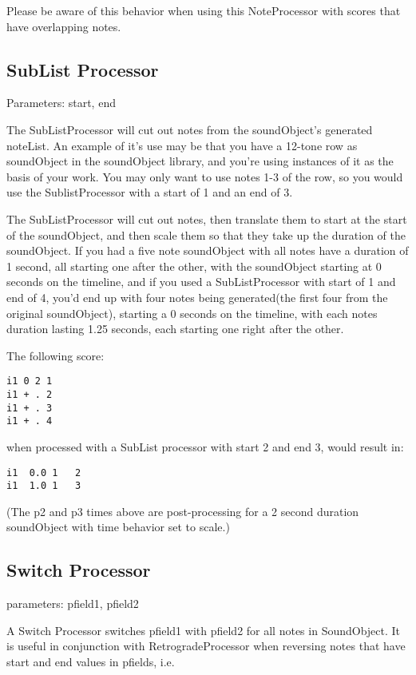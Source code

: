 Please be aware of this behavior when using this NoteProcessor with
scores that have overlapping notes.


\subsection{SubList Processor}\label{sublistProcessor}

Parameters: start, end

The SubListProcessor will cut out notes from the soundObject's generated
noteList. An example of it's use may be that you have a 12-tone row as
soundObject in the soundObject library, and you're using instances of it
as the basis of your work. You may only want to use notes 1-3 of the
row, so you would use the SublistProcessor with a start of 1 and an end
of 3.

The SubListProcessor will cut out notes, then translate them to start at
the start of the soundObject, and then scale them so that they take up
the duration of the soundObject. If you had a five note soundObject with
all notes have a duration of 1 second, all starting one after the other,
with the soundObject starting at 0 seconds on the timeline, and if you
used a SubListProcessor with start of 1 and end of 4, you'd end up with
four notes being generated(the first four from the original
soundObject), starting a 0 seconds on the timeline, with each notes
duration lasting 1.25 seconds, each starting one right after the other.

The following score:

\begin{verbatim}
i1 0 2 1
i1 + . 2
i1 + . 3
i1 + . 4
\end{verbatim}

when processed with a SubList processor with start 2 and end 3, would
result in:

\begin{verbatim}
i1  0.0 1   2
i1  1.0 1   3
\end{verbatim}

(The p2 and p3 times above are post-processing for a 2 second duration
soundObject with time behavior set to scale.)


\subsection{Switch Processor}\label{switchProcessor}

parameters: pfield1, pfield2

A Switch Processor switches pfield1 with pfield2 for all notes in
SoundObject. It is useful in conjunction with RetrogradeProcessor when
reversing notes that have start and end values in pfields, i.e.

